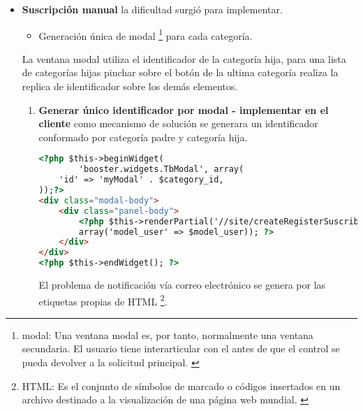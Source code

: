 \begin{itemize}

\item \textbf{Suscripción manual} la dificultad surgió para implementar.

\begin{itemize}

\item Generación única de modal \footnote{modal: Una ventana modal es,
por tanto, normalmente una ventana secundaria. El usuario tiene interarticular
con el antes de que el control se pueda devolver a la solicitud principal.
\cite{modal}} para cada categoría.

\end{itemize}

La ventana modal utiliza el identificador de la categoría hija, para una lista
de categorías hijas pinchar sobre el botón de la ultima categoría realiza la
replica de identificador sobre los demás elementos.

\begin{enumerate}

\item \textbf{Generar único identificador por modal - implementar en el cliente}
como mecanismo de solución se generara un identificador conformado por
categoría padre y categoría hija.

\begin{lstlisting}[language=HTML, caption={Generador ventana modal.}]
<?php $this->beginWidget(
        'booster.widgets.TbModal', array(
    'id' => 'myModal' . $category_id,
));?>
<div class="modal-body">
    <div class="panel-body">
        <?php $this->renderPartial('//site/createRegisterSuscribe', 
        array('model_user' => $model_user)); ?>
    </div>
</div>
<?php $this->endWidget(); ?>
\end{lstlisting}

El problema de notificación vía correo electrónico se genera por las etiquetas
propias de HTML \footnote{HTML: Es el conjunto de símbolos de marcado o
códigos insertados en un archivo destinado a la visualización de una página
web mundial. \cite{html}}.

\end{enumerate}


\end{itemize}

